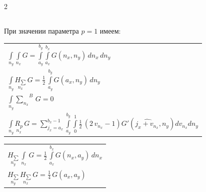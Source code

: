 \documentclass[twoside, 10pt]{article}
\def\myvspacebeforesubsection{-2.0mm}
\def\myvspaceaftersubsection{-2.5mm}
\begin{document}
\begin{multicols}{2}

\vspace{\myvspacebeforesubsection}
    \subsection*{} \label{summary-of-eulermaclaurin-2d}
\vspace{\myvspaceaftersubsection}


При значении параметра \(p = 1\) имеем:

    \begin{center}
\begin{tabular}{ l }

$\int\limits_{n_y}^{} \int\limits_{n_x}^{} G = \int\limits_{a_{y}}^{b_{y}} \int\limits_{a_{x}}^{b_{x}} G\left(n_{x}, n_{y}\right)\,{d n_{x}}\,{d n_{y}}$ \\

$\int\limits_{n_y}^{} \underset{n_x}{H_{\sum}}\,G = \frac{1}{2} \, \int\limits_{a_{y}}^{b_{y}} G\left(a_{x}, n_{y}\right)\,{d n_{y}}$ \\

$\int\limits_{n_y}^{} {\sum\limits_{n_x}^{}}^{B}\,G = 0$ \\

$\int\limits_{n_y}^{} \underset{n_x}{R_{p}}\,G = {\sum\limits_{j_{x}=a_{x}}^{b_{x} - 1} \int\limits_{a_{y}}^{b_{y}} \int\limits_{0}^{1} \frac{1}{2} \, {\left(2 \, v_{n_{x}} - 1\right)} G'\left(\widehat{j_{x} + v_{n_{x}}}, n_{y}\right){d v_{n_{x}}}{d n_{y}}}$ \\


\end{tabular}
\end{center}

    \begin{center}
\begin{tabular}{ l }


$\underset{n_y}{H_{\sum}}\,\int\limits_{n_x}^{}\,G = \frac{1}{2} \, \int\limits_{a_{x}}^{b_{x}} G\left(n_{x}, a_{y}\right)\,{d n_{x}}$ \\

$\underset{n_y}{H_{\sum}}\,\underset{n_x}{H_{\sum}}\,G = \frac{1}{4} \, G\left(a_{x}, a_{y}\right)$ \\


\end{tabular}
\end{center}
\end{multicols}
\end{document}

